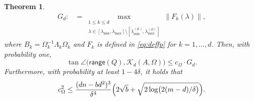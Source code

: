 \documentclass{article}
\newtheorem{theorem}{Theorem}
\newcommand{\cl}{(\mathsf{cl})}
\newcommand{\fp}{F}
\newcommand{\range}{\mathsf{range}}
\providecommand{\bignorm}[1]{\bigl\lVert#1\bigr\rVert}
\begin{document}
\begin{theorem}
\begin{equation*}
\begin{aligned}
        G_{d} :&= \max_{\substack{1\leq k\leq d\\ \lambda\in [\lambda_{\min},\lambda_{\max}]\setminus [\lambda_{\min}^{\cl},\lambda_{\max}^{\cl}]}}\bignorm{\fp_{k}(\lambda)},
    \end{aligned}
\end{equation*}
where $B_{k}=\Omega_{k}^{-1}\Lambda_{k}\Omega_{k}$ and $\fp_{k}$ is defined in \cref{eq:deffp} for $k=1,\dotsc,d$. Then, with probability one, 
\begin{equation}
    \label{eq:mainsb}
    \tan\angle\bigl(\range(Q),\mathcal{K}_{d}(A,\Omega)\bigr) \leq c_{\Omega}\cdot G_{d}.
\end{equation}
Furthermore, with probability at least $1-4\delta$, it holds that 
\begin{equation*}
    c_{\Omega}^{2}\leq  \frac{(dn-bd^{2})^{3}}{\delta^{4}}\Bigl(2\sqrt{b}+\sqrt{2\log\bigl(2(m-d)/\delta\bigr)}\Bigr).
\end{equation*}
\end{theorem}
\end{document}
